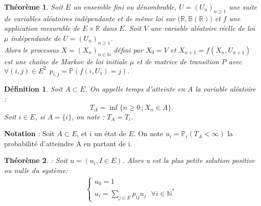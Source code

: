 \documentclass[12pt,a4paper]{report}
\newtheorem{thm}{Théorème}[section]
\newtheorem{definition}{Définition}[section]
\theoremstyle{remark}
\begin{document}
\begin{thm}\label{th1}
Soit $E$ un ensemble fini ou dénombrable, $U = (U_n)_{n\geq1}$ une suite de variables aléatoires indépendante et de même loi sur $(\mathbb{R},\mathbb{B(R))}$ et $f$ une application mesurable de $E \times \mathbb{R}$ dans $E$. Soit $V$ une variable aléatoire réelle de loi $\mu$ indépendante de 
$U = (U_n)_{n\geq1}$.\\
Alors le processus $X = (X_n)_{n\in \mathbb{N}}$ défini par $X_0=V$ et $X_{n+1}=f(X_{n},U_{n+1})$ est une chaîne de Markov de loi initiale $\mu$ et de matrice de transition P avec $ \forall (i,j) \in E^2 \ \  p_{i,j}=\mathbb{P}(f(i,U_{1})=j).$
\end{thm}

\begin{definition}\label{def1}
Soit $A \subset E$. On appelle temps d'atteinte en $A$ la variable aléatoire : $$T_A = \inf\{{n\geqslant 0} \, ; X_n \in A\}.$$ 
Soit $i \in E$, si $A = \{i\}$, on note : $T_A = T_i$.
\end{definition}

\textbf{Notation} : Soit $A \subset E$, et $i$ un état de $E$. On note $u_i=\mathbb{P}_i(T_A <\infty)$ la probabilité d'atteindre A en partant de i.

\begin{thm}\label{th2}: Soit $u = (u_i , I \in E)$. Alors u est la plus petite solution positive ou nulle du système:
\begin{align*}
 \left\{
\begin{array}{ll}
        u_0=1\\
        u_i= \sum\limits_{j\in E} p_{ij}u_j \ \ \ \forall i \in \mathbb{N}^*
    \end{array}
\right.
\end{align*}
\end{thm}
\end{document}
